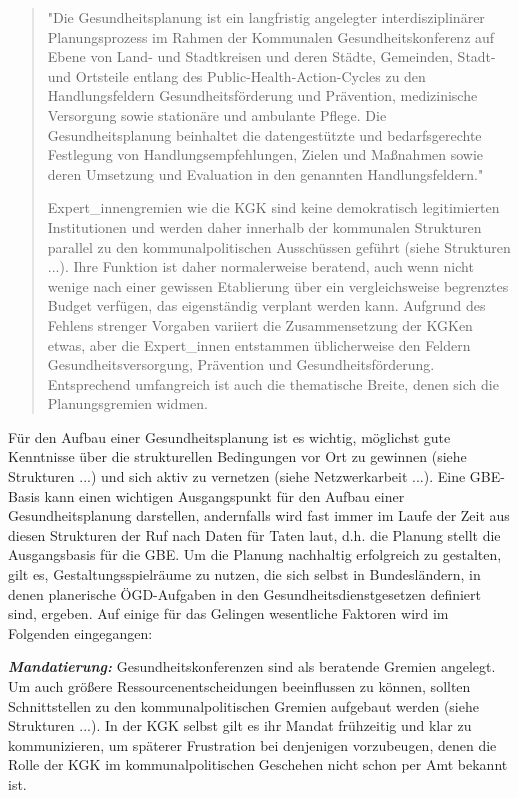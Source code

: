 \documentclass{article}
\begin{document}
\begin{quote}



"Die Gesundheitsplanung ist ein langfristig angelegter interdisziplinärer Planungsprozess im Rahmen der Kommunalen Gesundheitskonferenz auf Ebene von Land- und Stadtkreisen und deren Städte, Gemeinden, Stadt- und Ortsteile entlang des Public-Health-Action-Cycles zu den Handlungsfeldern Gesundheitsförderung und Prävention, medizinische Versorgung sowie stationäre und ambulante Pflege. Die Gesundheitsplanung beinhaltet die datengestützte und bedarfsgerechte Festlegung von Handlungsempfehlungen, Zielen und Maßnahmen sowie deren Umsetzung und Evaluation in den genannten Handlungsfeldern." \autocite{Albrichundweitere2017}


Expert\_innengremien wie die KGK sind keine demokratisch legitimierten Institutionen und werden daher innerhalb der kommunalen Strukturen parallel zu den kommunalpolitischen Ausschüssen geführt (siehe Strukturen ...\autocite{Hollederer2014}). Ihre Funktion ist daher normalerweise beratend, auch wenn nicht wenige nach einer gewissen Etablierung über ein vergleichsweise begrenztes Budget verfügen, das eigenständig verplant werden kann. Aufgrund des Fehlens strenger Vorgaben variiert die Zusammensetzung der KGKen etwas, aber die Expert\_innen entstammen üblicherweise den Feldern Gesundheitsversorgung, Prävention und Gesundheitsförderung. Entsprechend umfangreich ist auch die thematische Breite, denen sich die Planungsgremien widmen.


\end{quote}


Für den Aufbau einer Gesundheitsplanung ist es wichtig, möglichst gute Kenntnisse über die strukturellen Bedingungen vor Ort zu gewinnen (siehe Strukturen ...) und sich aktiv zu vernetzen (siehe Netzwerkarbeit ...). Eine GBE-Basis kann einen wichtigen Ausgangspunkt für den Aufbau einer Gesundheitsplanung darstellen, andernfalls wird fast immer im Laufe der Zeit aus diesen Strukturen der Ruf nach Daten für Taten laut, d.h. die Planung stellt die Ausgangsbasis für die GBE. Um die Planung nachhaltig erfolgreich zu gestalten, gilt es, Gestaltungsspielräume zu nutzen, die sich selbst in Bundesländern, in denen planerische ÖGD-Aufgaben in den Gesundheitsdienstgesetzen definiert sind, ergeben. Auf einige für das Gelingen wesentliche Faktoren wird im Folgenden eingegangen:  


\emph{\textbf{Mandatierung: }}Gesundheitskonferenzen sind als beratende Gremien angelegt. Um auch größere Ressourcenentscheidungen beeinflussen zu können, sollten Schnittstellen zu den kommunalpolitischen Gremien aufgebaut werden (siehe Strukturen ...). In der KGK selbst gilt es ihr Mandat frühzeitig und klar zu kommunizieren, um späterer Frustration bei denjenigen vorzubeugen, denen die Rolle der KGK im kommunalpolitischen Geschehen nicht schon per Amt bekannt ist. 
\end{document}
